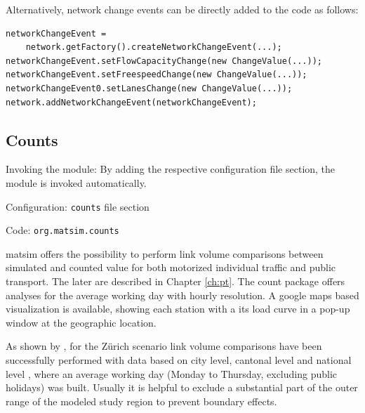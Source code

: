 Alternatively, network change events can be directly added to the code as follows:
\begin{lstlisting}
networkChangeEvent =
	network.getFactory().createNetworkChangeEvent(...);
networkChangeEvent.setFlowCapacityChange(new ChangeValue(...));
networkChangeEvent.setFreespeedChange(new ChangeValue(...));
networkChangeEvent0.setLanesChange(new ChangeValue(...));
network.addNetworkChangeEvent(networkChangeEvent);
\end{lstlisting}


\subsection{Counts}
\label{sec:counts}
\begin{compactitem}
\item Invoking the module: By adding the respective configuration file section, the module is invoked automatically.
\item Configuration: \lstinline|counts| file section
\item Code: \lstinline|org.matsim.counts|
\end{compactitem}

\gls{matsim} offers the possibility to perform link volume comparisons between simulated and counted value for both motorized individual traffic \citep{Horni_unpub_IVT_2007}  and public transport. The later are described in Chapter \ref{ch:pt}. The count package offers analyses for the average working day with hourly resolution. A google maps based visualization is available, showing each station with a its load curve in a pop-up window at the geographic location.

As shown by \citet[][]{BalmerEtAl_ResRep_bdktzrh_2009}, for the Zürich scenario link volume comparisons have been successfully performed with data based on city level, cantonal level and national level \citep[][]{ASTRA_Webpage_2006}, where an average working day (Monday to Thursday, excluding public holidays) was built. Usually it is helpful to exclude a substantial part of the outer range of the modeled study region to prevent boundary effects.

